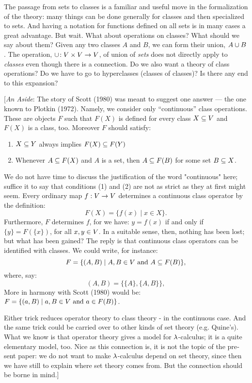 The passage from sets to classes is a familiar and useful move in the formalization of the theory: many things can be done generally for classes and then specialized to sets. And having a notation for functions defined on all sets is in many cases a great advantage. But wait. What about operations on classes? What should we say about them? Given any two classes $A$ and $B$, we can form their union, $A \cup  B$. The operation, $\cup\!: V \times V \rightarrow V$, of union of {\it sets} does not directly apply to {\it classes} even though there is a connection. Do we also want a theory of class operations? Do we have to go to hyperclasses (classes of classes)? Is there any end to this expansion?


[{\it An Aside}: The story of Scott (1980) was meant to suggest one answer --- the one known to Plotkin (1972). Namely, we con­sider only ``continuous'' class operations. These are objects $F$ such that $F(X)$ is defined for every class $X \subseteq V$ and $F(X)$ is a class, too. Moreover $F$ should satisfy:

\begin{enumerate}

\item $X \subseteq Y$ always implies $F(X)\subseteq F(Y)$

\item Whenever $A \subseteq F(X)$ and $A$ is a set, then $A\subseteq F(B)$ for some set $B \subseteq X$.

\end{enumerate}
%
We do not have time to discuss the justification of the word "continuous" here; suffice it to say that conditions (1) and (2) are not as strict as they at first might seem. Every ordinary map $f : V \rightarrow V$ determines a continuous class operator by the def­inition:
$$
F(X) = \{f(x) \mid x \in X\}.
$$
%
Furthermore, $F$ determines $f$, for we have: $y = f(x)$ if and only if $\{y\} = F(\{x\})$,
for all $x,y \in V$. In a suitable sense, then, nothing has been lost; but what has been gained?
The reply is that continuous class operators can be identi­fied with classes. We could write, for instance:
$$ F = \{(A,B) \mid A,B \in V {\textrm { and }} A \subseteq F(B) \},$$
where, say:
$$
(A,B) = \{\{A\}, \{A,B\}\},
$$
More in harmony with Scott (1980) would be: $F = \{(a,B) \mid  a,B \in V {\textrm { and } } a \in F(B)\}$.

Either trick reduces operator theory to class theory - in the continuous case. And the same trick could be carried over to other kinds of set theory (e.g. Quine's). What we know is that operator theory gives a model for $\lambda$-calculus; it is a quite elementary model, too. Nice as this connection is, it is not the topic of the pre­ sent paper: we do not want to make $\lambda$-calculus depend on set theory, since then we have still to explain where set theory comes from. But the connection should be borne in mind.]

